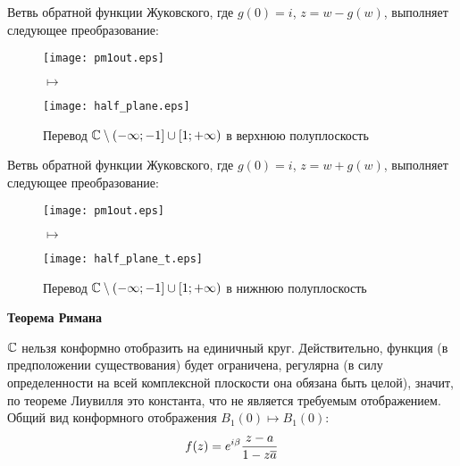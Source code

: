 \FloatBarrier
\Example
Ветвь обратной функции Жуковского, где $g(0) = i$, $z = w - g(w)$, выполняет
следующее преобразование:
\\
\begin{figure}[h!]
        \begin{minipage}[c]{0.45\textwidth}
        \centering
        \texttt{[image: pm1out.eps]}
    \end{minipage}
    \begin{minipage}[c]{0.1\textwidth}
        \centering
        \LARGE{$\mapsto$}
    \end{minipage}
    \begin{minipage}[c]{0.45\textwidth}
        \centering
        \texttt{[image: half\_plane.eps]}
    \end{minipage}
    \label{fig:24.16}
    \caption{Перевод $\mathbb{C} \setminus (-\infty;-1]\cup[1;+\infty)$ в верхнюю полуплоскость}
\end{figure}
\FloatBarrier
\Example
Ветвь обратной функции Жуковского, где $g(0) = i$, $z = w + g(w)$, выполняет
следующее преобразование:
\\
\begin{figure}[h!]
        \begin{minipage}[c]{0.45\textwidth}
        \centering
        \texttt{[image: pm1out.eps]}
    \end{minipage}
    \begin{minipage}[c]{0.1\textwidth}
        \centering
        \LARGE{$\mapsto$}
    \end{minipage}
    \begin{minipage}[c]{0.45\textwidth}
        \centering
        \texttt{[image: half\_plane\_t.eps]}
    \end{minipage}
    \label{fig:24.17}
    \caption{Перевод $\mathbb{C} \setminus (-\infty;-1]\cup[1;+\infty)$ в нижнюю полуплоскость}
\end{figure}
\FloatBarrier
\begin{center}
    \textbf{Теорема Римана}
\end{center}
$\mathbb{C}$ нельзя конформно отобразить на единичный круг. Действительно, функция (в
предположении существования) будет ограничена, регулярна (в силу определенности
на всей комплексной плоскости она обязана быть целой), значит, по теореме
Лиувилля это константа, что не является требуемым отображением.
\theorem
Общий вид конформного отображения $B_1(0) \mapsto B_1(0)$:
\begin{equation}\label{(24.4)}
    f(z) = e^{i\beta}\frac{z-a}{1-z\overline{a}}
\end{equation}
